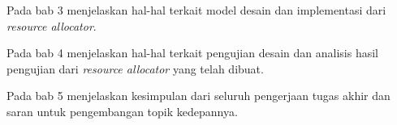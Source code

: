 Pada bab 3 menjelaskan hal-hal terkait model desain dan implementasi dari \textit{resource allocator}.

Pada bab 4 menjelaskan hal-hal terkait pengujian desain dan analisis hasil pengujian dari \textit{resource allocator} yang telah dibuat. 

Pada bab 5 menjelaskan kesimpulan dari seluruh pengerjaan tugas akhir dan saran untuk pengembangan topik kedepannya.




